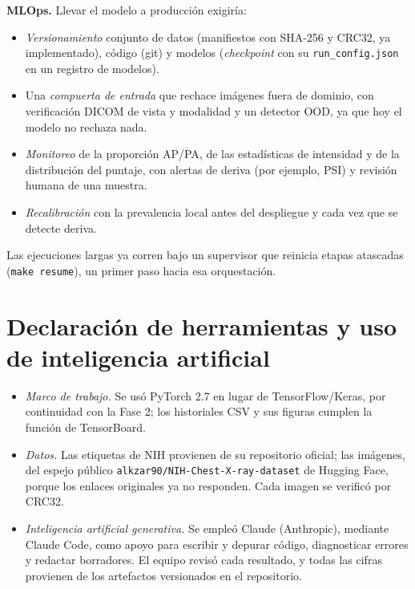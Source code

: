\documentclass[11pt]{article}
\begin{document}
\textbf{MLOps.} Llevar el modelo a producción exigiría:
\begin{itemize}
\item \emph{Versionamiento} conjunto de datos (manifiestos con SHA-256 y CRC32, ya implementado), código (git) y modelos (\emph{checkpoint} con su \texttt{run\_config.json} en un registro de modelos).
\item Una \emph{compuerta de entrada} que rechace imágenes fuera de dominio, con verificación DICOM de vista y modalidad y un detector OOD, ya que hoy el modelo no rechaza nada.
\item \emph{Monitoreo} de la proporción AP/PA, de las estadísticas de intensidad y de la distribución del puntaje, con alertas de deriva (por ejemplo, PSI) y revisión humana de una muestra.
\item \emph{Recalibración} con la prevalencia local antes del despliegue y cada vez que se detecte deriva.
\end{itemize}
Las ejecuciones largas ya corren bajo un supervisor que reinicia etapas atascadas (\texttt{make resume}), un primer paso hacia esa orquestación.

\section{Declaración de herramientas y uso de inteligencia artificial}\label{sec:declaracion}
\begin{itemize}
\item \emph{Marco de trabajo.} Se usó PyTorch 2.7 en lugar de TensorFlow/Keras, por continuidad con la Fase 2; los historiales CSV y sus figuras cumplen la función de TensorBoard.
\item \emph{Datos.} Las etiquetas de NIH provienen de su repositorio oficial; las imágenes, del espejo público \texttt{alkzar90/NIH-Chest-X-ray-dataset} de Hugging Face, porque los enlaces originales ya no responden. Cada imagen se verificó por CRC32.
\item \emph{Inteligencia artificial generativa.} Se empleó Claude (Anthropic), mediante Claude Code, como apoyo para escribir y depurar código, diagnosticar errores y redactar borradores. El equipo revisó cada resultado, y todas las cifras provienen de los artefactos versionados en el repositorio.
\end{itemize}

\printbibliography

\appendix
\end{document}
